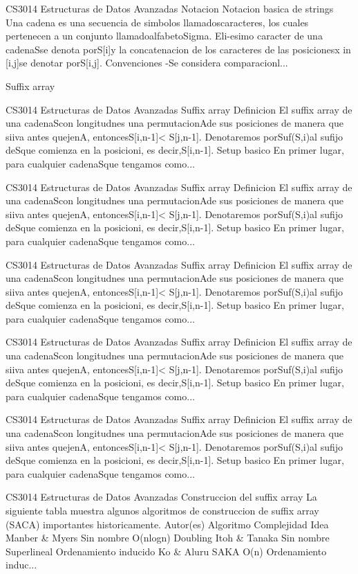 \begin{description}[leftmargin=!,labelwidth=4.2em,style=nextline]
\item[Pag. 11] CS3014 Estructuras de Datos Avanzadas Notacion Notacion basica de strings Una cadena es una secuencia de simbolos llamadoscaracteres, los cuales pertenecen a un conjunto llamadoalfabetoSigma. Eli-esimo caracter de una cadenaSse denota porS[i]y la concatenacion de los caracteres de las posicionesx in [i,j]se denotar porS[i,j]. Convenciones -Se considera comparacionl...
\item[Pag. 12] Suffix array
\item[Pag. 13] CS3014 Estructuras de Datos Avanzadas Suffix array Definicion El suffix array de una cadenaScon longitudnes una permutacionAde sus posiciones de manera que siiva antes quejenA, entoncesS[i,n-1]< S[j,n-1]. Denotaremos porSuf(S,i)al sufijo deSque comienza en la posicioni, es decir,S[i,n-1]. Setup basico En primer lugar, para cualquier cadenaSque tengamos como...
\item[Pag. 14] CS3014 Estructuras de Datos Avanzadas Suffix array Definicion El suffix array de una cadenaScon longitudnes una permutacionAde sus posiciones de manera que siiva antes quejenA, entoncesS[i,n-1]< S[j,n-1]. Denotaremos porSuf(S,i)al sufijo deSque comienza en la posicioni, es decir,S[i,n-1]. Setup basico En primer lugar, para cualquier cadenaSque tengamos como...
\item[Pag. 15] CS3014 Estructuras de Datos Avanzadas Suffix array Definicion El suffix array de una cadenaScon longitudnes una permutacionAde sus posiciones de manera que siiva antes quejenA, entoncesS[i,n-1]< S[j,n-1]. Denotaremos porSuf(S,i)al sufijo deSque comienza en la posicioni, es decir,S[i,n-1]. Setup basico En primer lugar, para cualquier cadenaSque tengamos como...
\item[Pag. 16] CS3014 Estructuras de Datos Avanzadas Suffix array Definicion El suffix array de una cadenaScon longitudnes una permutacionAde sus posiciones de manera que siiva antes quejenA, entoncesS[i,n-1]< S[j,n-1]. Denotaremos porSuf(S,i)al sufijo deSque comienza en la posicioni, es decir,S[i,n-1]. Setup basico En primer lugar, para cualquier cadenaSque tengamos como...
\item[Pag. 17] CS3014 Estructuras de Datos Avanzadas Suffix array Definicion El suffix array de una cadenaScon longitudnes una permutacionAde sus posiciones de manera que siiva antes quejenA, entoncesS[i,n-1]< S[j,n-1]. Denotaremos porSuf(S,i)al sufijo deSque comienza en la posicioni, es decir,S[i,n-1]. Setup basico En primer lugar, para cualquier cadenaSque tengamos como...
\item[Pag. 18] CS3014 Estructuras de Datos Avanzadas Construccion del suffix array La siguiente tabla muestra algunos algoritmos de construccion de suffix array (SACA) importantes historicamente. Autor(es) Algoritmo Complejidad Idea Manber \& Myers Sin nombre O(nlogn) Doubling Itoh \& Tanaka Sin nombre Superlineal Ordenamiento inducido Ko \& Aluru SAKA O(n) Ordenamiento induc...

\end{description}
